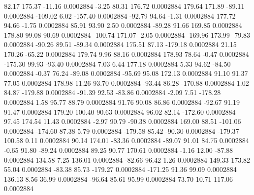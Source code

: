        82.17      175.37      -11.16     0.0002884
       -3.25       80.31      176.72     0.0002884
      179.64      171.89      -89.11     0.0002884
     -109.02        6.02     -157.40     0.0002884
      -92.79       94.64       -1.31     0.0002884
      177.72       94.66       -1.75     0.0002884
       85.91       93.90        2.50     0.0002884
      -89.28       91.66      169.85     0.0002884
      178.80       99.08       90.69     0.0002884
     -100.74      171.07       -2.05     0.0002884
     -169.96      173.99      -79.83     0.0002884
      -90.26       89.51      -89.34     0.0002884
      175.51       87.13     -179.18     0.0002884
       21.15      170.26      -65.22     0.0002884
      179.74        9.96       88.16     0.0002884
      178.93       78.64       -0.47     0.0002884
     -175.30       99.93      -93.40     0.0002884
        7.03        6.44      177.18     0.0002884
        5.33       94.62      -84.50     0.0002884
       -0.37       76.24      -89.08     0.0002884
      -95.69       95.08      172.13     0.0002884
       91.10       91.37       77.05     0.0002884
      178.98       11.26       93.70     0.0002884
      -93.44       86.28     -170.88     0.0002884
        1.02       84.87     -179.88     0.0002884
      -91.39       92.53      -83.86     0.0002884
       -2.09        7.51     -178.28     0.0002884
        1.58       95.77       88.79     0.0002884
       91.76       90.08       86.86     0.0002884
      -92.67       91.19       91.47     0.0002884
      179.20      100.40       90.63     0.0002884
       96.02       82.14     -172.60     0.0002884
       97.45      174.54       11.43     0.0002884
       -2.97       90.79      -90.38     0.0002884
      169.00       88.51     -101.06     0.0002884
     -174.60       87.38        5.79     0.0002884
     -179.58       85.42      -90.30     0.0002884
     -179.37      100.58        0.11     0.0002884
       90.14      174.01      -83.36     0.0002884
      -89.07       91.01       84.75     0.0002884
       -0.65       91.80      -89.24     0.0002884
       89.25       90.77      170.61     0.0002884
       -1.16       12.00      -87.88     0.0002884
      134.58        7.25      136.01     0.0002884
      -82.66       96.42        1.26     0.0002884
      149.33      173.82       55.04     0.0002884
      -83.38       85.73     -179.27     0.0002884
     -171.25       91.36       99.09     0.0002884
      136.13        8.56       36.99     0.0002884
      -96.64       85.61       95.99     0.0002884
       73.70       10.71      117.06     0.0002884
